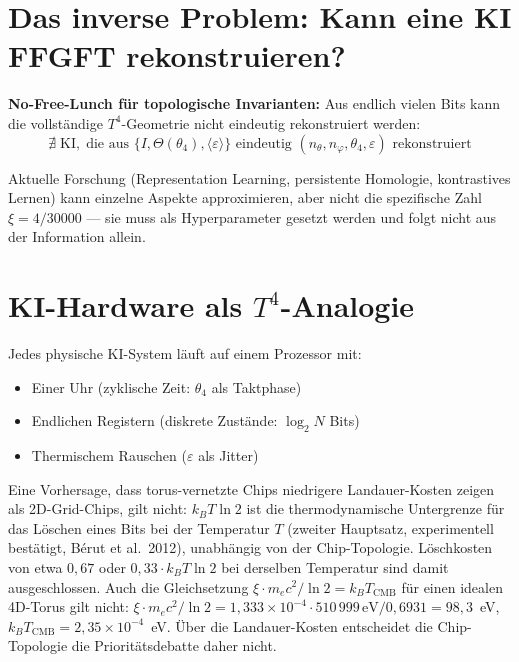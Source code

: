 \section{Das inverse Problem: Kann eine KI FFGFT rekonstruieren?}

\textbf{No-Free-Lunch für topologische Invarianten:} Aus endlich vielen
Bits kann die vollständige $T^4$-Geometrie nicht eindeutig rekonstruiert werden:
\begin{equation}
  \nexists\;\text{KI},\;\text{die aus }
  \{I,\Theta(\theta_4),\langle\varepsilon\rangle\}
  \text{ eindeutig }
  (n_\theta,n_\varphi,\theta_4,\varepsilon) \text{ rekonstruiert}
  \tag{243.14}
\end{equation}

Aktuelle Forschung (Representation Learning, persistente Homologie,
kontrastives Lernen) kann einzelne Aspekte approximieren, aber nicht
die spezifische Zahl $\xi = 4/30000$ --- sie muss als Hyperparameter
gesetzt werden und folgt nicht aus der Information allein.

\section{KI-Hardware als $T^4$-Analogie}

Jedes physische KI-System läuft auf einem Prozessor mit:
\begin{itemize}
  \item Einer Uhr (zyklische Zeit: $\theta_4$ als Taktphase)
  \item Endlichen Registern (diskrete Zustände: $\log_2 N$ Bits)
  \item Thermischem Rauschen ($\varepsilon$ als Jitter)
\end{itemize}

Eine Vorhersage, dass torus-vernetzte Chips niedrigere Landauer-Kosten
zeigen als 2D-Grid-Chips, gilt nicht: $k_BT\ln2$ ist die thermodynamische
Untergrenze für das Löschen eines Bits bei der Temperatur $T$ (zweiter
Hauptsatz, experimentell bestätigt, Bérut et al.\ 2012), unabhängig von der
Chip-Topologie. Löschkosten von etwa $0{,}67$ oder $0{,}33\cdot k_BT\ln2$ bei
derselben Temperatur sind damit ausgeschlossen. Auch die Gleichsetzung
$\xi\cdot m_ec^2/\ln2 = k_BT_\text{CMB}$ für einen idealen 4D-Torus gilt
nicht: $\xi\cdot m_ec^2/\ln2 = 1{,}333\times10^{-4}\cdot510\,999\,\text{eV}/0{,}6931 = 98{,}3$~eV,
$k_BT_\text{CMB} = 2{,}35\times10^{-4}$~eV. Über die Landauer-Kosten
entscheidet die Chip-Topologie die Prioritätsdebatte daher nicht.

